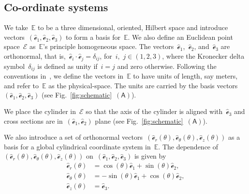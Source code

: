 \documentclass[preprint,12pt,times]{elsarticle}
\numberwithin{equation}{section}
\newcommand{\physe}{\hat{\mathscr{e}}} %
\newcommand{\pr}[1]{\left( #1 \right)}
\newcommand{\subf}[1]{\pr{\textsf{#1}}}
\renewcommand{\>}{$\Rightarrow$}
\begin{document}
\subsection{Co-ordinate systems}
We take~$\mathbb{E}$ to be a three dimensional, oriented, Hilbert space and introduce vectors~$(\physe_1,\physe_2,\physe_3)$ to form a basis for~$\mathbb{E}$. We also define an Euclidean point space~$\mathcal{E}$ as~$\mathbb{E}$'s principle homogeneous space.
The vectors~$\physe_1$,~$\physe_2$, and~$\physe_3$ are orthonormal, that is,~$\physe_i\cdot\physe_j=\delta_{ij}$, for~$i$,~$j\in (1,2,3)$, where the Kronecker delta symbol~$\delta_{ij}$ is defined as unity if~$i=j$ and zero otherwise.
Following the conventions in~\cite{rahaman2020accelerometer,deng2021angle}, we define the vectors in~$\mathbb{E}$ to have units of length, say meters, and refer to~$\mathbb{E}$ as the physical-space. The units are carried by the basis vectors~$(\physe_1,\physe_2,\physe_3)$ (see Fig.~\ref{fig:schematic}~$\subf{A}$).

We place the cylinder in~$\mathcal{E}$ so that the axis of the cylinder is aligned with~$\physe_3$ and cross sections are in~$(\physe_1,\physe_2)$ plane (see Fig.~\ref{fig:schematic}~$\subf{A}$).

We also introduce a set of orthonormal vectors~$(\physe_{r}(\theta),\physe_{\theta}(\theta),\physe_{z}(\theta))$ as a basis for a global cylindrical coordinate system in~$\mathbb{E}$. The dependence of~$(\physe_{r}(\theta),\physe_{\theta}(\theta),\physe_{z}(\theta))$ on~$(\physe_1,\physe_2,\physe_3)$ is given by
\begin{subequations}
\begin{align}
\physe_{r}(\theta) & = \cos(\theta) \physe_1 + \sin(\theta) \physe_2 , \\
\physe_{\theta}(\theta) & = -\sin(\theta) \physe_1 + \cos(\theta) \physe_2 , \\
\physe_{z} (\theta) & =  \physe_3.
\end{align}
\end{subequations}
\end{document}

